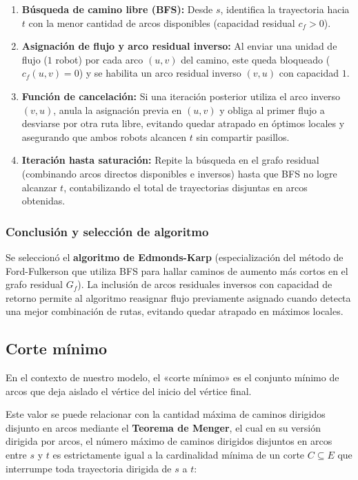 \documentclass[12pt,a4paper]{article}
\begin{document}
\begin{enumerate}
\def\labelenumi{\arabic{enumi}.}
\item
  \textbf{Búsqueda de camino libre (BFS):} Desde \(s\), identifica la trayectoria hacia \(t\) con la menor cantidad de arcos disponibles (capacidad residual \(c_f > 0\)).
\item
  \textbf{Asignación de flujo y arco residual inverso:} Al enviar una unidad de flujo (\(1\) robot) por cada arco \((u, v)\) del camino, este queda bloqueado (\(c_f(u, v) = 0\)) y se habilita un arco residual inverso \((v, u)\) con capacidad \(1\).
\item
  \textbf{Función de cancelación:} Si una iteración posterior utiliza el arco inverso \((v, u)\), anula la asignación previa en \((u, v)\) y obliga al primer flujo a desviarse por otra ruta libre, evitando quedar atrapado en óptimos locales y asegurando que ambos robots alcancen \(t\) sin compartir pasillos.
\item
  \textbf{Iteración hasta saturación:} Repite la búsqueda en el grafo residual (combinando arcos directos disponibles e inversos) hasta que BFS no logre alcanzar \(t\), contabilizando el total de trayectorias disjuntas en arcos obtenidas.
\end{enumerate}

\subsubsection{Conclusión y selección de algoritmo}\label{conclusiuxf3n-y-selecciuxf3n-de-algoritmo}

Se seleccionó el \textbf{algoritmo de Edmonds-Karp} (especialización del método de Ford-Fulkerson que utiliza BFS para hallar caminos de aumento más cortos en el grafo residual \(G_f\)). La inclusión de arcos residuales inversos con capacidad de retorno permite al algoritmo reasignar flujo previamente asignado cuando detecta una mejor combinación de rutas, evitando quedar atrapado en máximos locales.

\subsection{Corte mínimo}\label{corte-muxednimo}

En el contexto de nuestro modelo, el «corte mínimo» es el conjunto mínimo de arcos que deja aislado el vértice del inicio del vértice final.

Este valor se puede relacionar con la cantidad máxima de caminos dirigidos disjunto en arcos mediante el \textbf{Teorema de Menger}, el cual en su versión dirigida por arcos, el número máximo de caminos dirigidos disjuntos en arcos entre \(s\) y \(t\) es estrictamente igual a la cardinalidad mínima de un corte \(C \subseteq E\) que interrumpe toda trayectoria dirigida de \(s\) a \(t\):
\end{document}
